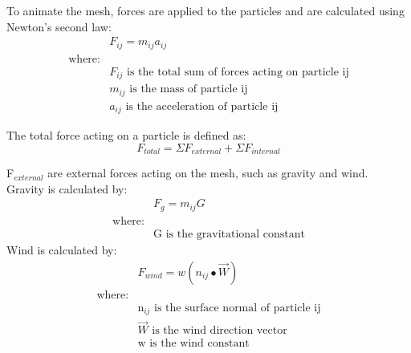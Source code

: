 To animate the mesh, forces are applied to the particles and are calculated using Newton's second law:
\begin{equation}
\begin{split}
\label{eq:newton second law}
  &F_{ij} = m_{ij}a_{ij}
\\\text{where:}
\\&F_{ij}\text{ is the total sum of forces acting on particle ij}
\\&m_{ij}\text{ is the mass of particle ij}
\\&a_{ij}\text{ is the acceleration of particle ij}
\end{split}
\end{equation}

The total force acting on a particle is defined as:
\begin{equation}
\label{eq:total force}
  F_{total} = \Sigma F_{external} + \Sigma F_{internal}
\end{equation}

F$_{external}$ are external forces acting on the mesh, such as gravity and wind.
\\Gravity is calculated by:
\begin{equation}
\begin{split}
\label{eq:gravity}
  &F_{g} = m_{ij}G
  \\\text{where:}
  \\&\text{G is the gravitational constant}
\end{split}
\end{equation}
Wind is calculated by:
\begin{equation}
\begin{split}
\label{eq:wind}
  &F_{wind} = w(n_{ij}\bullet\overrightarrow{W})
  \\\text{where:}
  \\&\text{n$_{ij}$ is the surface normal of particle ij}
  \\&\text{$\overrightarrow{W}$ is the wind direction vector}
  \\&\text{w is the wind constant}
\end{split}
\end{equation}


